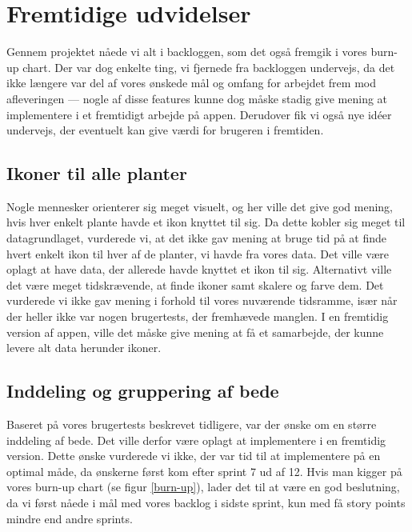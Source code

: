 \section{Fremtidige udvidelser}
Gennem projektet nåede vi alt i backloggen, som det også fremgik i vores burn-up chart. Der var dog enkelte ting, vi fjernede fra backloggen undervejs, da det ikke længere var del af vores ønskede mål og omfang for arbejdet frem mod afleveringen --- nogle af disse features kunne dog måske stadig give mening at implementere i et fremtidigt arbejde på appen. Derudover fik vi også nye idéer undervejs, der eventuelt kan give værdi for brugeren i fremtiden.

\subsection{Ikoner til alle planter}
Nogle mennesker orienterer sig meget visuelt, og her ville det give god mening, hvis hver enkelt plante havde et ikon knyttet til sig. Da dette kobler sig meget til datagrundlaget, vurderede vi, at det ikke gav mening at bruge tid på at finde hvert enkelt ikon til hver af de planter, vi havde fra vores data. Det ville være oplagt at have data, der allerede havde knyttet et ikon til sig. Alternativt ville det være meget tidskrævende, at finde ikoner samt skalere og farve dem. Det vurderede vi ikke gav mening i forhold til vores nuværende tidsramme, især når der heller ikke var nogen brugertests, der fremhævede manglen. I en fremtidig version af appen, ville det måske give mening at få et samarbejde, der kunne levere alt data herunder ikoner. 

\subsection{Inddeling og gruppering af bede}
\label{gruppering-af-bede}
Baseret på vores brugertests beskrevet tidligere, var der ønske om en større inddeling af bede. Det ville derfor være oplagt at implementere i en fremtidig version. Dette ønske vurderede vi ikke, der var tid til at implementere på en optimal måde, da ønskerne først kom efter sprint 7 ud af 12. Hvis man kigger på vores burn-up chart (se figur \ref{burn-up}), lader det til at være en god beslutning, da vi først nåede i mål med vores backlog i sidste sprint, kun med få story points mindre end andre sprints.


